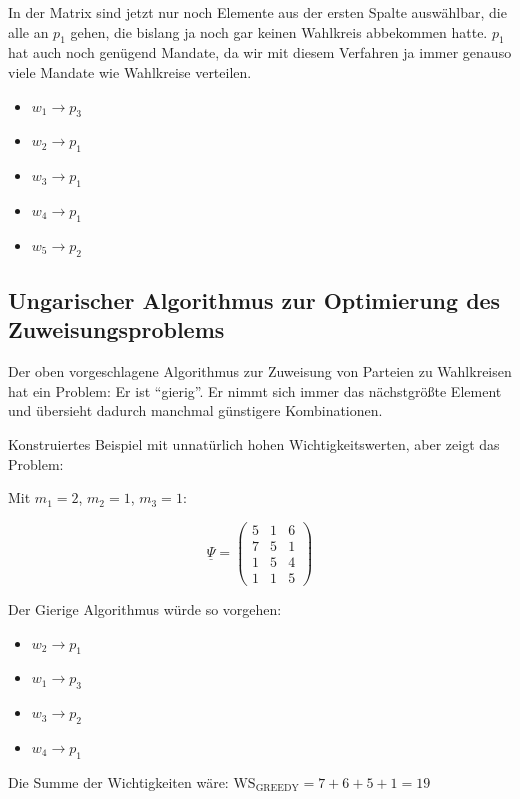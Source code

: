 In der Matrix sind jetzt nur noch Elemente aus der ersten Spalte auswählbar, die alle an $p_1$
gehen, die bislang ja noch gar keinen Wahlkreis abbekommen hatte. $p_1$ hat auch noch genügend
Mandate, da wir mit diesem Verfahren ja immer genauso viele Mandate wie Wahlkreise verteilen.


\begin{itemize}[label={}]
  \item $w_1 \longrightarrow p_3$
  \item $w_2 \longrightarrow p_1$
  \item $w_3 \longrightarrow p_1$
  \item $w_4 \longrightarrow p_1$
  \item $w_5 \longrightarrow p_2$
\end{itemize}

\subsection{Ungarischer Algorithmus zur Optimierung des Zuweisungsproblems}

Der oben vorgeschlagene Algorithmus zur Zuweisung von Parteien zu Wahlkreisen hat ein Problem: Er
ist \enquote{gierig}. Er nimmt sich immer das nächstgrößte Element und übersieht dadurch manchmal
günstigere Kombinationen.

Konstruiertes Beispiel mit unnatürlich hohen Wichtigkeitswerten, aber zeigt das Problem:

Mit $m_1 = 2$, $m_2 = 1$, $m_3 = 1$:

\[
  \underline{\Psi} = \begin{pmatrix}
    5 & 1 & 6 \\
    7 & 5 & 1 \\
    1 & 5 & 4 \\
    1 & 1 & 5
  \end{pmatrix}
\]

Der Gierige Algorithmus würde so vorgehen:
\begin{itemize}[label={}]
  \item $w_2 \longrightarrow p_1$
  \item $w_1 \longrightarrow p_3$
  \item $w_3 \longrightarrow p_2$
  \item $w_4 \longrightarrow p_1$
\end{itemize}

Die Summe der Wichtigkeiten wäre: $\mathrm{WS}_{\mathrm{GREEDY}} = 7 + 6 + 5 + 1 = 19$

